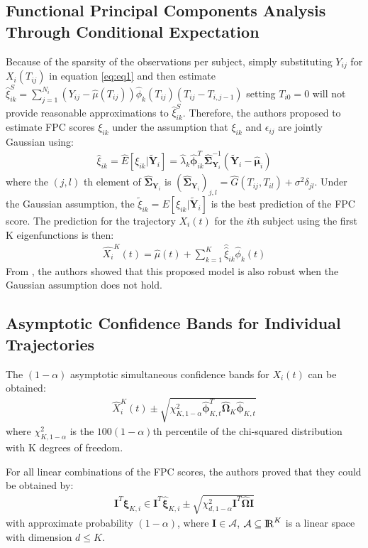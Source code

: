 \documentclass[11pt]{report}
\begin{document}
\subsection*{Functional Principal Components Analysis Through Conditional Expectation}
Because of the sparsity of the observations per subject, simply substituting $Y_{ij}$ for $X_i(T_{ij})$ in equation \eqref{eq:eq1} and then estimate $\hat{\xi}_{ik}^S = \sum_{j=1}^{N_i}(Y_{ij}-\hat{\mu}(T_{ij}))\hat{\phi}_k(T_{ij})(T_{ij}-T_{i,j-1})$ setting $T_{i0}=0$ will not provide reasonable approximations to $\hat{\xi}_{ik}^S$. 
Therefore, the authors proposed to estimate FPC scores $\xi_{ik}$ under the assumption that $\xi_{ik}$ and $\epsilon_{ij}$ are jointly Gaussian using:
\begin{align}
	\label{eq:eq5}
	\hat{\xi}_{ik} = \widehat{E}{[\xi_{ik}|\widetilde{\pmb{Y}}_i]} = \hat{\lambda}_k\hat{\pmb{\phi}}_{ik}^T\hat{\pmb{\Sigma}}_{\pmb{Y}_i}^{-1}(\tilde{\pmb{Y}}_i - \hat{\pmb{\mu}}_i)
\end{align}
where the $(j,l)$ th element of $\hat{\mathbf{\Sigma}}_{\mathbf{Y}_i}$ is $(\hat{\mathbf{\Sigma}}_{\mathbf{Y}_i})_{j,l} = \hat{G}(T_{ij}, T_{il}) + \sigma^2\delta_{jl}$. Under the Gaussian assumption, the $\tilde{\xi}_{ik} = E[\xi_{ik}|\widetilde{\pmb{Y}}_i]$ is the best prediction of the FPC score. 
The prediction for the trajectory $X_i(t)$ for the $i$th subject using the first K eigenfunctions is then:
\begin{align}
	\label{eq:eq6}
	\widehat{X_i}^K(t) = \hat{\mu}(t)+\sum_{k=1}^{K}\hat{\hat{\xi}}_{ik}\hat{\phi}_k(t)
\end{align}
From , the authors showed that this proposed model is also robust when the Gaussian assumption does not hold. 


\subsection*{Asymptotic Confidence Bands for Individual Trajectories}
The $(1-\alpha)$ asymptotic simultaneous confidence bands for $X_i(t)$ can be obtained:
\begin{align}
	\label{eq:eq8}
	\widehat{X}_i^K(t) \pm \sqrt{\chi^2_{K,1-\alpha}\hat{\pmb{\phi}}_{K,t}^T\widehat{\pmb{\Omega}}_K\hat{\pmb{\phi}}_{K,t}}
\end{align}
where $\chi^2_{K,1-\alpha}$ is the $100(1-\alpha)$th percentile of the chi-squared distribution with K degrees of freedom. 

For all linear combinations of the FPC scores, the authors proved that they could be obtained by:
\begin{align}
	\label{eq:eq9}
	\pmb{I}^T\pmb{\xi}_{K,i} \in \pmb{I}^T\hat{\pmb{\xi}}_{K,i} \pm \sqrt{\chi^2_{d,1-\alpha}\pmb{I}^T\widehat{\pmb{\Omega}}\pmb{I}}
\end{align}
with approximate probability $(1-\alpha)$, where $\mathbf{I}\in \mathcal{A}$, $\mathcal{A} \subseteq {\rm I\!R}^K$ is a linear space with dimension $d\leq K$.
\end{document}
